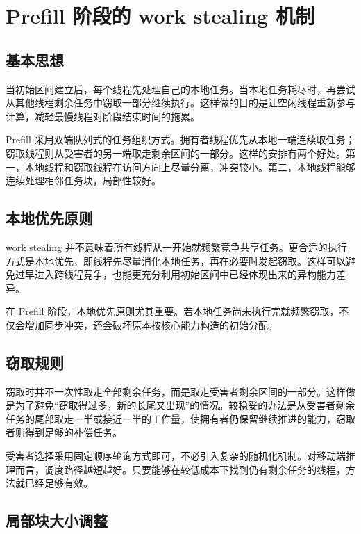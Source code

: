 \section{Prefill 阶段的 work stealing 机制}

\subsection{基本思想}

当初始区间建立后，每个线程先处理自己的本地任务。当本地任务耗尽时，再尝试从其他线程剩余任务中窃取一部分继续执行。这样做的目的是让空闲线程重新参与计算，减轻最慢线程对阶段结束时间的拖累\cite{blumofe1999workstealing,chase2005deque}。

Prefill 采用双端队列式的任务组织方式。拥有者线程优先从本地一端连续取任务；窃取线程则从受害者的另一端取走剩余区间的一部分。这样的安排有两个好处。第一，本地线程和窃取线程在访问方向上尽量分离，冲突较小。第二，本地线程能够连续处理相邻任务块，局部性较好。

\subsection{本地优先原则}

work stealing 并不意味着所有线程从一开始就频繁竞争共享任务。更合适的执行方式是本地优先，即线程先尽量消化本地任务，再在必要时发起窃取。这样可以避免过早进入跨线程竞争，也能更充分利用初始区间中已经体现出来的异构能力差异。

在 Prefill 阶段，本地优先原则尤其重要。若本地任务尚未执行完就频繁窃取，不仅会增加同步冲突，还会破坏原本按核心能力构造的初始分配。

\subsection{窃取规则}

窃取时并不一次性取走全部剩余任务，而是取走受害者剩余区间的一部分。这样做是为了避免“窃取得过多，新的长尾又出现”的情况。较稳妥的办法是从受害者剩余任务的尾部取走一半或接近一半的工作量，使拥有者仍保留继续推进的能力，窃取者则得到足够的补偿任务。

受害者选择采用固定顺序轮询方式即可，不必引入复杂的随机化机制。对移动端推理而言，调度路径越短越好。只要能够在较低成本下找到仍有剩余任务的线程，方法就已经足够有效。

\subsection{局部块大小调整}

